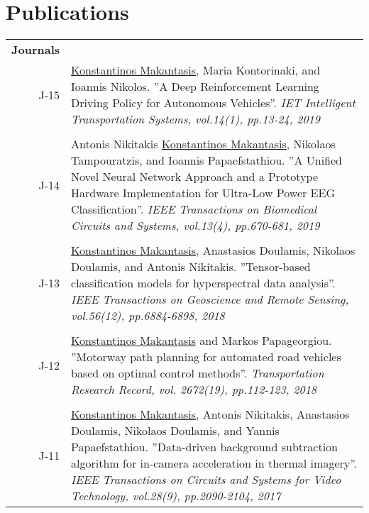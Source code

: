 \documentclass[a4paper,10pt]{article}
\begin{document}
\section{Publications}
\begin{longtable}{r p{11cm}}
\textbf{Journals} &  \\
J-15 &\small{\underline{Konstantinos Makantasis}, Maria Kontorinaki, and Ioannis Nikolos. ''A Deep Reinforcement Learning Driving Policy for Autonomous Vehicles''. \textit{IET Intelligent Transportation Systems, vol.14(1), pp.13-24, 2019}}\\
\multicolumn{2}{c}{} \\
J-14 &\small{Antonis Nikitakis \underline{Konstantinos Makantasis}, Nikolaos Tampouratzis, and Ioannis Papaefstathiou. ''A Unified Novel Neural Network Approach and a Prototype Hardware Implementation for Ultra-Low Power EEG Classification''. \textit{IEEE Transactions on Biomedical Circuits and Systems, vol.13(4), pp.670-681, 2019}}\\
\multicolumn{2}{c}{} \\
J-13 &\small{\underline{Konstantinos Makantasis}, Anastasios Doulamis, Nikolaos Doulamis, and Antonis Nikitakis. ''Tensor-based classification models for hyperspectral data analysis''. \textit{ IEEE Transactions on Geoscience and Remote Sensing, vol.56(12), pp.6884-6898, 2018}}\\
 \multicolumn{2}{c}{} \\
 J-12 &\small{\underline{Konstantinos Makantasis} and Markos Papageorgiou. ''Motorway path planning for automated road vehicles based on optimal control methods''. \textit{Transportation Research Record, vol. 2672(19), pp.112-123, 2018}}\\
 \multicolumn{2}{c}{} \\
J-11 &\small{\underline{Konstantinos Makantasis}, Antonis Nikitakis, Anastasios Doulamis, Nikolaos Doulamis, and Yannis Papaefstathiou. ''Data-driven background subtraction algorithm for in-camera acceleration in thermal imagery''. \textit{IEEE Transactions on Circuits and Systems for Video Technology, vol.28(9), pp.2090-2104, 2017}}\\

\end{longtable}
\end{document}
